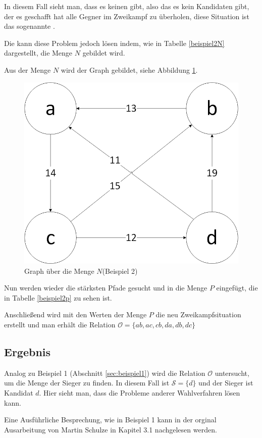 In diesem Fall sieht man, dass es keinen \condorcetSieger gibt, also das es kein Kandidaten gibt, der es geschafft hat alle Gegner im Zweikampf zu überholen, diese Situation ist das sogenannte \condorcetParadox. \citep{EnricoSchoebel2018}

\newpage
Die \schulze kann diese Problem jedoch lösen indem, wie in Tabelle \ref{beispiel2N} dargestellt, die Menge $N$ gebildet wird.



Aus der Menge $N$ wird der Graph gebildet, siehe Abbildung \ref{fig:graph2}.

\begin{figure}[!h]
\centering
\includegraphics[scale=0.5]{Bilder/Beispiel2_Graph.png}
\caption{Graph über die Menge $N$(Beispiel 2)}
\label{fig:graph2}
\end{figure}

Nun werden wieder die stärksten Pfade gesucht und in die Menge $P$ eingefügt, die in Tabelle \ref{beispiel2p} zu sehen ist.



Anschließend wird mit den Werten der Menge $P$ die neu Zweikampfsituation erstellt und man erhält die Relation $\mathcal{O} = \{ ab,ac,cb,da,db,dc \}$


\subsection{Ergebnis} 
\label{sec:ergebnis2}
Analog zu Beispiel 1 (Abschnitt \ref{sec:beispiel1}) wird die Relation $\mathcal{O}$ untersucht, um die Menge der Sieger zu finden. In diesem Fall ist $\mathcal{S}=\{d\}$  und der Sieger ist Kandidat $d$. Hier sieht man, dass die \schulze Probleme anderer Wahlverfahren lösen kann.

Eine Ausführliche Besprechung, wie in Beispiel 1 kann in der orginal Ausarbeitung von Martin Schulze in Kapitel 3.1 nachgelesen werden. \citep{Schulze2017}
